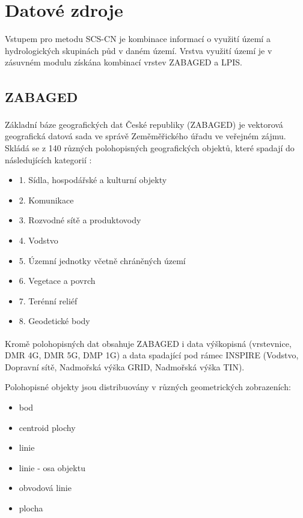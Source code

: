\documentclass[a4paper,oneside,12pt]{book}
\begin{document}
\section{Datové zdroje} \label{data}
\hspace{10mm} Vstupem pro metodu SCS-CN je kombinace informací o využití území a hydrologických skupinách půd v daném území. Vrstva využití území je v zásuvném modulu získána kombinací vrstev ZABAGED a LPIS. 

\newpage
\subsection{ZABAGED\texorpdfstring{\textsuperscript{\textregistered}}{ (R)}} \label{zabaged}

\hspace{10mm} Základní báze geografických dat České republiky (ZABAGED\texorpdfstring{\textsuperscript{\textregistered}}{ (R)}) je vektorová geografická datová sada ve správě Zeměměřického úřadu ve veřejném zájmu. Skládá se z 140 různých polohopisných geografických objektů, které spadají do následujících kategorií \cite{nEFEg7XpI9hVQCiO} :
\begin{itemize}
\item 1. Sídla, hospodářské a kulturní objekty
\item 2. Komunikace
\item 3. Rozvodné sítě a produktovody
\item 4. Vodstvo 
\item 5. Územní jednotky včetně chráněných území
\item 6. Vegetace a povrch
\item 7. Terénní reliéf
\item 8. Geodetické body
\end{itemize}
\hspace{10mm} Kromě polohopisných dat obsahuje ZABAGED\texorpdfstring{\textsuperscript{\textregistered}}{ (R)} i data výškopisná (vrstevnice, DMR 4G, DMR 5G, DMP 1G) a data spadající pod rámec INSPIRE (Vodstvo, Dopravní sítě, Nadmořská výška GRID, Nadmořská výška TIN). \cite{nEFEg7XpI9hVQCiO} 


\hspace{10mm} Polohopisné objekty jsou distribuovány v různých geometrických zobrazeních:
\begin{itemize}
\item bod
\item centroid plochy
\item linie
\item linie - osa objektu
\item obvodová linie
\item plocha
\end{itemize}
\end{document}
